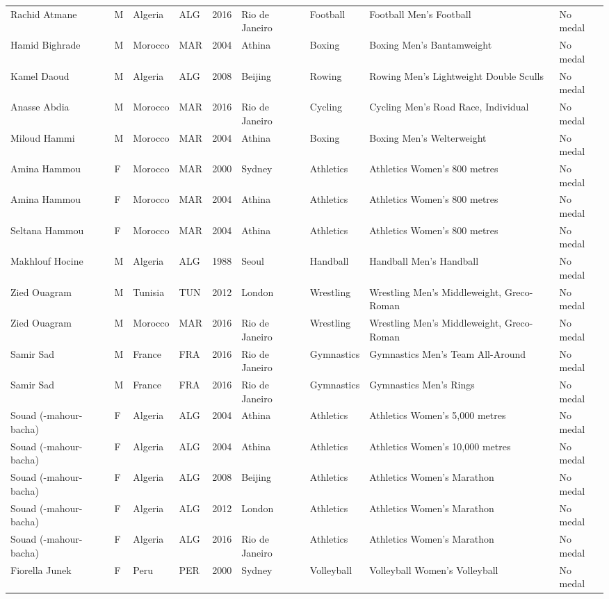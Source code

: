 \documentclass{article}%
\begin{document}
\begin{longtable}{p{1.5cm} p{0.5cm} p{2cm} p{1cm} p{1cm} p{1.5cm} p{1.5cm} p{5cm} p{1.5cm}}
Rachid Atmane&M&Algeria&ALG&2016&Rio de Janeiro&Football&Football Men's Football&No medal\\%
Hamid Bighrade&M&Morocco&MAR&2004&Athina&Boxing&Boxing Men's Bantamweight&No medal\\%
Kamel Daoud&M&Algeria&ALG&2008&Beijing&Rowing&Rowing Men's Lightweight Double Sculls&No medal\\%
Anasse Abdia&M&Morocco&MAR&2016&Rio de Janeiro&Cycling&Cycling Men's Road Race, Individual&No medal\\%
Miloud Hammi&M&Morocco&MAR&2004&Athina&Boxing&Boxing Men's Welterweight&No medal\\%
Amina Hammou&F&Morocco&MAR&2000&Sydney&Athletics&Athletics Women's 800 metres&No medal\\%
Amina Hammou&F&Morocco&MAR&2004&Athina&Athletics&Athletics Women's 800 metres&No medal\\%
Seltana Hammou&F&Morocco&MAR&2004&Athina&Athletics&Athletics Women's 800 metres&No medal\\%
Makhlouf Hocine&M&Algeria&ALG&1988&Seoul&Handball&Handball Men's Handball&No medal\\%
Zied Ouagram&M&Tunisia&TUN&2012&London&Wrestling&Wrestling Men's Middleweight, Greco{-}Roman&No medal\\%
Zied Ouagram&M&Morocco&MAR&2016&Rio de Janeiro&Wrestling&Wrestling Men's Middleweight, Greco{-}Roman&No medal\\%
Samir Sad&M&France&FRA&2016&Rio de Janeiro&Gymnastics&Gymnastics Men's Team All{-}Around&No medal\\%
Samir Sad&M&France&FRA&2016&Rio de Janeiro&Gymnastics&Gymnastics Men's Rings&No medal\\%
Souad ({-}mahour{-}bacha)&F&Algeria&ALG&2004&Athina&Athletics&Athletics Women's 5,000 metres&No medal\\%
Souad ({-}mahour{-}bacha)&F&Algeria&ALG&2004&Athina&Athletics&Athletics Women's 10,000 metres&No medal\\%
Souad ({-}mahour{-}bacha)&F&Algeria&ALG&2008&Beijing&Athletics&Athletics Women's Marathon&No medal\\%
Souad ({-}mahour{-}bacha)&F&Algeria&ALG&2012&London&Athletics&Athletics Women's Marathon&No medal\\%
Souad ({-}mahour{-}bacha)&F&Algeria&ALG&2016&Rio de Janeiro&Athletics&Athletics Women's Marathon&No medal\\%
Fiorella Junek&F&Peru&PER&2000&Sydney&Volleyball&Volleyball Women's Volleyball&No medal\\%

\end{longtable}
\end{document}
